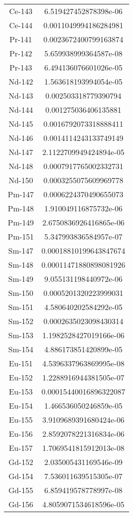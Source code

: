 \begin{table}[h!]
\begin{tabular}{|| c || c |}
Ce-143 & 6.519427452878398e-06 \\
Ce-144 & 0.0011049994186284981 \\
Pr-141 & 0.0023672400799163874 \\
Pr-142 & 5.659938999364587e-08 \\
Pr-143 & 6.494136076601026e-05 \\
Nd-142 & 1.563618193994054e-05 \\
Nd-143 & 0.002503318779390794 \\
Nd-144 & 0.001275036406135881 \\
Nd-145 & 0.0016792073318888411 \\
Nd-146 & 0.0014114243133749149 \\
Nd-147 & 2.1122709949424894e-05 \\
Nd-148 & 0.0007917765002332731 \\
Nd-150 & 0.0003255075609969778 \\
Pm-147 & 0.0006224370490655073 \\
Pm-148 & 1.910049116875732e-06 \\
Pm-149 & 2.6750836926416865e-06 \\
Pm-151 & 5.347993836584957e-07 \\
Sm-147 & 0.00018810199643847674 \\
Sm-148 & 0.00011471880898081926 \\
Sm-149 & 9.055131198440972e-06 \\
Sm-150 & 0.0005201320223999031 \\
Sm-151 & 4.580640202584292e-05 \\
Sm-152 & 0.0002635023098430314 \\
Sm-153 & 1.1982528427019166e-06 \\
Sm-154 & 4.886173851420899e-05 \\
Eu-151 & 4.5396337963869995e-08 \\
Eu-152 & 1.2288916944381505e-07 \\
Eu-153 & 0.00015440016896322087 \\
Eu-154 & 1.466536050246859e-05 \\
Eu-155 & 3.9109689391680424e-06 \\
Eu-156 & 2.8592078221316834e-06 \\
Eu-157 & 1.7069541815912013e-08 \\
Gd-152 & 2.035005431169546e-09 \\
Gd-154 & 7.536011639515305e-07 \\
Gd-155 & 6.859419578778997e-08 \\
Gd-156 & 4.8059071534618596e-05 \\

\end{tabular}
\end{table}
